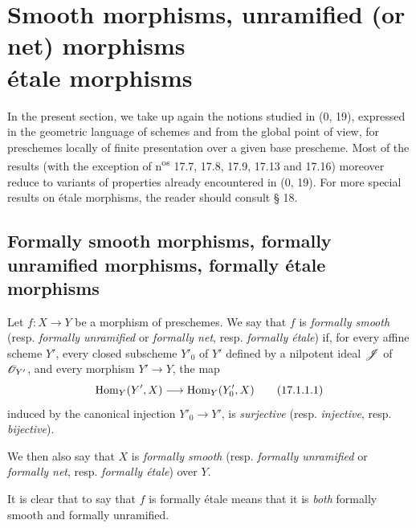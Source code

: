 \section[Smooth morphisms, unramified (or net) morphisms étale morphisms]{Smooth morphisms, unramified (or net) morphisms\\étale morphisms}
\label{section:IV.17}

In the present section, we take up again the notions studied in (0, 19), expressed in the geometric language of schemes and from the global point of view, for preschemes locally of finite presentation over a given base prescheme. Most of the results (with the exception of n\textsuperscript{os} 17.7, 17.8, 17.9, 17.13 and 17.16) moreover reduce to variants of properties already encountered in (0, 19). For more special results on étale morphisms, the reader should consult § 18.

\subsection{Formally smooth morphisms, formally unramified morphisms, formally étale morphisms}

\begin{definition}[17.1.1]\label{IV.17.1.1}
Let $f:X\to Y$ be a morphism of preschemes. We say that $f$ is \emph{formally smooth} (resp. \emph{formally unramified} or \emph{formally net}, resp. \emph{formally étale}) if, for every affine scheme $Y'$, every closed subscheme $Y'_0$ of $Y'$ defined by a nilpotent ideal $\mathscr{J}$ of $\mathscr{O}_{Y'}$, and every morphism $Y'\to Y$, the map
\[
\label{IV.17.1.1.1}
  \operatorname{Hom}_Y(Y',X)\longrightarrow\operatorname{Hom}_Y(Y'_0,X)
  \tag{17.1.1.1}
\]
induced by the canonical injection $Y'_0\to Y'$, is \emph{surjective} (resp. \emph{injective}, resp. \emph{bijective}).
\end{definition}

We then also say that $X$ is \emph{formally smooth} (resp. \emph{formally unramified} or \emph{formally net}, resp. \emph{formally étale}) over $Y$.

It is clear that to say that $f$ is formally étale means that it is \emph{both} formally smooth and formally unramified.

